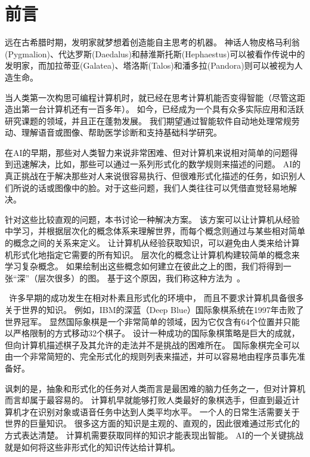 \chapter{前言}
\label{chap:introduction}
远在古希腊时期，发明家就梦想着创造能自主思考的机器。
神话人物皮格马利翁(Pygmalion)、代达罗斯(Daedalus)和赫淮斯托斯(Hephaestus)可以被看作传说中的发明家，而加拉蒂亚(Galatea)、塔洛斯(Talos)和潘多拉(Pandora)则可以被视为人造生命\citep{ovid2004metamorphoses,sparkes1996red,stubbs_hesiods_1998}。

当人类第一次构思可编程计算机时，就已经在思考计算机能否变得智能（尽管这距造出第一台计算机还有一百多年）\citep{menabrea_sketch_1843}。
如今，已经成为一个具有众多实际应用和活跃研究课题的领域，并且正在蓬勃发展。
我们期望通过智能软件自动地处理常规劳动、理解语音或图像、帮助医学诊断和支持基础科学研究。

在\gls{AI}的早期，那些对人类智力来说非常困难、但对计算机来说相对简单的问题得到迅速解决，比如，那些可以通过一系列形式化的数学规则来描述的问题。
\gls{AI}的真正挑战在于解决那些对人来说很容易执行、但很难形式化描述的任务，如识别人们所说的话或图像中的脸。对于这些问题，我们人类往往可以凭借直觉轻易地解决。


针对这些比较直观的问题，本书讨论一种解决方案。
该方案可以让计算机从经验中学习，并根据层次化的概念体系来理解世界，而每个概念则通过与某些相对简单的概念之间的关系来定义。
让计算机从经验获取知识，可以避免由人类来给计算机形式化地指定它需要的所有知识。
层次化的概念让计算机构建较简单的概念来学习复杂概念。
如果绘制出这些概念如何建立在彼此之上的图，我们将得到一张``深''（层次很多）的图。
基于这个原因，我们称这种方法为~。


~许多早期的成功发生在相对朴素且形式化的环境中， 而且不要求计算机具备很多关于世界的知识。
例如，IBM的深蓝（Deep Blue）国际象棋系统在1997年击败了世界冠军\citep{Hsu2002}。
显然国际象棋是一个非常简单的领域，因为它仅含有64个位置并只能以严格限制的方式移动32个棋子。
设计一种成功的国际象棋策略是巨大的成就，但向计算机描述棋子及其允许的走法并不是挑战的困难所在。
国际象棋完全可以由一个非常简短的、完全形式化的规则列表来描述，并可以容易地由程序员事先准备好。

讽刺的是，抽象和形式化的任务对人类而言是最困难的脑力任务之一，但对计算机而言却属于最容易的。
计算机早就能够打败人类最好的象棋选手，但直到最近计算机才在识别对象或语音任务中达到人类平均水平。
一个人的日常生活需要关于世界的巨量知识。
很多这方面的知识是主观的、直观的，因此很难通过形式化的方式表达清楚。
计算机需要获取同样的知识才能表现出智能。
\gls{AI}的一个关键挑战就是如何将这些非形式化的知识传达给计算机。

